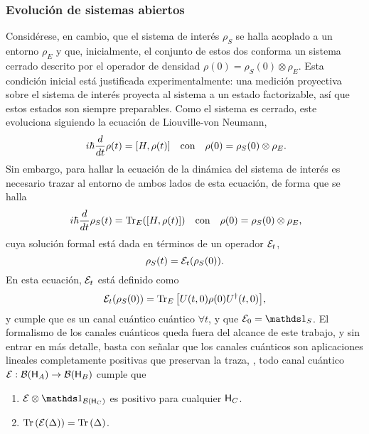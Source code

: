 \subsubsection{Evolución de sistemas abiertos}
Considérese, en cambio, que el sistema de interés $\rho_{S}$ se halla acoplado a un entorno $\rho_{E}$ y que, inicialmente, el conjunto de estos dos conforma un sistema cerrado descrito por el operador de densidad $\rho(0)=\rho_{S}(0)\otimes\rho_{E}$. Esta condición inicial está justificada experimentalmente: una medición proyectiva sobre el sistema de interés proyecta al sistema a un estado factorizable, así que estos estados son siempre preparables. Como el sistema es cerrado, este evoluciona siguiendo la ecuación de Liouville-von Neumann,
\begin{align}
    i\hbar\frac{d}{d t} \rho(t)=[H,\rho(t)] && \text{con} && \rho(0)=\rho_{S}(0)\otimes\rho_{E}\rlap{.}\nonumber
\end{align}
Sin embargo, para hallar la ecuación de la dinámica del sistema de interés es necesario trazar al entorno de ambos lados de esta ecuación, de forma que se halla
\begin{align}
    i\hbar\frac{d}{d t} \rho_{S}(t)=\Tr_{E}([H,\rho(t)]) && \text{con} && \rho(0)=\rho_{S}(0)\otimes\rho_{E}\rlap{,}\nonumber
\end{align}
cuya solución formal está dada en términos de un operador $\mathcal{E}_{t}$,
\begin{equation}
    \rho_{S}(t)=\mathcal{E}_{t}(\rho_{S}(0)).\nonumber
\end{equation}
En esta ecuación, $\mathcal{E}_{t}$ está definido como
 \begin{equation}
    \mathcal{E}_{t}(\rho_{S}(0))=\Tr_{E}\qty[U(t,0)\rho(0)U^{\dag}(t,0)],\nonumber
 \end{equation}
 y cumple que es un canal cuántico  cuántico $\forall t$, y que $\mcE_{0}=\Id_{S}$. El formalismo de los canales cuánticos queda fuera del alcance de este trabajo, y sin entrar en más detalle, basta con señalar que los canales cuánticos son aplicaciones lineales completamente positivas que preservan la traza, \ie, todo canal cuántico $\mathcal{E}:\mathcal{B}({\sf H}_{A})\rightarrow \mathcal{B}({\sf H}_{B})$ cumple que \cite{Watrous}
 \begin{enumerate}
    \item $\mcE\otimes \Id_{\mcB(\hilbert_{C})}$ es positivo para cualquier ${\sf H}_{C}$.
    \item $\Tr\qty(\mathcal{E}(\Delta))=\Tr\qty(\Delta)$.
 \end{enumerate}
